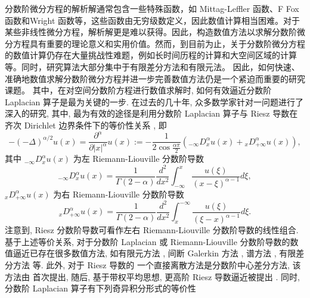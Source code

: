分数阶微分方程的解析解通常包含一些特殊函数，如 Mittag-Leffler 函数、F Fox 函数和Wright 函数等，这些函数由无穷级数定义，因此数值计算相当困难。对于某些非线性微分方程，解析解更是难以获得。因此，构造数值方法以求解分数阶微分方程具有重要的理论意义和实用价值。然而，到目前为止，关于分数阶微分方程的数值计算仍存在大量挑战性难题，例如长时间历程的计算和大空间区域的计算等。同时，研究算法大部分集中于有限差分方法和有限元法。
因此，如何快速、准确地数值求解分数阶微分方程并进一步完善数值方法仍是一个紧迫而重要的研究课题。
其中，在对空间分数阶方程进行数值求解时, 如何有效逼近分数阶 Laplacian 算子是最为关键的一步. 
在过去的几十年, 众多数学家针对一问题进行了深入的研究, 其中, 最为有效的途径是利用分数阶 Laplacian 算子与 Riesz 导数在齐次 Dirichlet 边界条件下的等价性关系 \cite{yangNumericalMethodsFractional2010,demengelFunctionalSpacesTheory2012}, 即
\begin{equation}
-(-\Delta)^{\alpha / 2} u(x)=\frac{\partial^\alpha}{\partial|x|^\alpha} u(x):=-\frac{1}{2 \cos \frac{\alpha \pi}{2}}\left({ }_{-\infty }D_x^\alpha u(x)+{ }_x D_{+\infty}^\alpha u(x)\right),
\end{equation}
其中 ${ }_{-\infty} D_x^\alpha u(x)$ 为左 Riemann-Liouville 分数阶导数
\begin{equation}
{ }_{-\infty} D_x^\alpha u(x)=\frac{1}{\Gamma(2-\alpha)} \frac{d^2}{d x^2} \int_{-\infty}^x \frac{u(\xi)}{(x-\xi)^{\alpha-1}} d \xi,
\end{equation}
${ }_x D_{+\infty}^\alpha u(x)$ 为右 Riemann-Liouville 分数阶导数
\begin{equation}
{ }_x D_{+\infty}^\alpha u(x)=\frac{1}{\Gamma(2-\alpha)} \frac{d^2}{d x^2} \int^{-\infty}_x \frac{u(\xi)}{(\xi-x)^{\alpha-1}} d \xi .
\end{equation}
注意到, Riesz 分数阶导数可看作左右 Riemann-Liouville 分数阶导数的线性组合.
基于上述等价关系, 对于分数阶 Laplacian 或 Riemann-Liouville 分数阶导数的数值逼近已存在很多数值方法, 如有限元方法 \cite{dengFiniteElementMethod2009,ervinNumericalApproximationTime2007}, 间断 Galerkin 方法 \cite{xuDiscontinuousGalerkinMethod2014}, 谱方法 \cite{zayernouriFractionalSpectralCollocation2014,zengCrankNicolsonADI2014}, 有限差分方法 \cite{chenFourthOrderAccurate2014,meerschaertFiniteDifferenceApproximations2004} 等. 
此外, 对于 Riesz 导数的 一个直接离散方法是分数阶中心差分方法, 该方法由 \cite{duAnalysisApproximationNonlocal2012} 首次提出, 随后, 基于带权平均思想, 更高阶 Riesz 导数逼近被提出 \cite{dingHighorderAlgorithmsRiesz2015,zhangFourthOrderCompactDifference2014}.
同时, 分数阶 Laplacian 算子有下列奇异积分形式的等价性 \cite{duAnalysisApproximationNonlocal2012}
